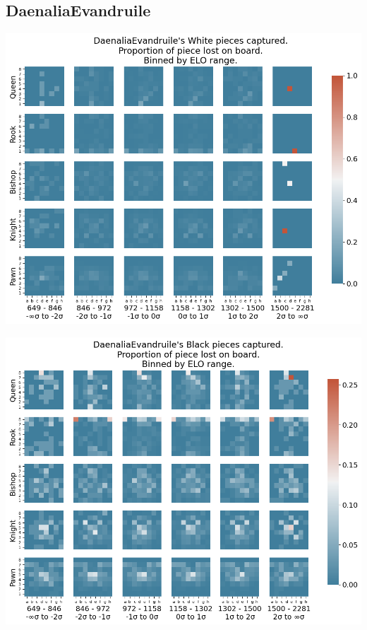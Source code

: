 \documentclass[11pt]{article}
\begin{document}
\subsection{DaenaliaEvandruile}
\label{sec:org4c1573b}
\begin{center}
\includegraphics[width=\textwidth]{Images/DaenaliaEvandruile_HEATMAP_Queen_Rook_Bishop_Knight_Pawn_WHITE_ELO.png}
\end{center}

\begin{center}
\includegraphics[width=\textwidth]{Images/DaenaliaEvandruile_HEATMAP_Queen_Rook_Bishop_Knight_Pawn_BLACK_ELO.png}
\end{center}
\end{document}
